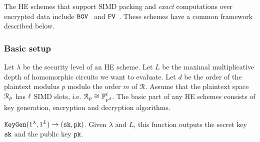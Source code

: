 
The HE schemes that support SIMD packing and \emph{exact} computations over encrypted data include $\mathtt{BGV}$~\cite{BGV12} and $\mathtt{FV}$~\cite{FV12}. 
These schemes have a common framework described below.

\subsubsection{Basic setup}

Let $\lambda$ be the security level of an HE scheme.
Let $L$ be the maximal multiplicative depth of homomorphic circuits we want to evaluate.
Let $d$ be the order of the plaintext modulus $p$ modulo the order $m$ of $\mathcal{R}$.
Assume that the plaintext space $\mathcal{R}_p$ has $\ell$ SIMD slots, i.e. $\mathcal{R}_p \cong \mathbb{F}^\ell_{p^d}$.
The basic part of any HE schemes consists of key generation, encryption and decryption algorithms.

${\mathtt{KeyGen}}(1^\lambda, 1^L) \rightarrow ({\mathtt{sk}}, {\mathtt{pk}})$. Given $\lambda$ and $L$, this function outputs the secret key ${\mathtt{sk}}$ and the public key ${\mathtt{pk}}$.

